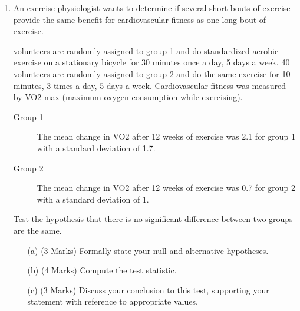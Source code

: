 \documentclass[]{article}
\begin{document}
\begin{enumerate}
\item
An exercise physiologist wants to determine if several short bouts of exercise provide the same benefit for cardiovascular fitness as one long bout of exercise. \\ \smallskip

 volunteers are randomly assigned to group 1 and do standardized aerobic exercise on a stationary bicycle for 30 minutes once a day, 5 days a week. 40 volunteers are randomly assigned to group 2 and do the same exercise for 10 minutes, 3 times a day, 5 days a week. Cardiovascular fitness was measured by VO2 max (maximum oxygen consumption while exercising). 

\begin{description}
	\item[Group 1] The mean change in VO2 after 12 weeks of exercise was 2.1 for group 1 with a standard deviation of 1.7.
	\item[Group 2] The mean change in VO2 after 12 weeks of exercise was 0.7 for group 2 with a standard deviation of 1. 
\end{description}

\noindent Test the hypothesis that there is no significant difference between two groups are the same.
	
\begin{itemize}
	\item[(a)](3 Marks) Formally state your null and alternative hypotheses.
	\item[(b)](4 Marks) Compute the test statistic.
	\item[(c)](3 Marks) Discuss your conclusion to this test, supporting your statement with reference to appropriate values.
\end{itemize}


\end{enumerate}
\end{document}
